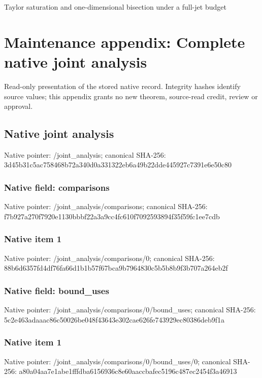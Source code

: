 \documentclass[10pt,a4paper]{article}
\begin{document}
\begingroup\raggedright\sloppy Taylor saturation and one-dimensional bisection under a full-jet budget\par\endgroup

\section{Maintenance appendix: Complete native joint analysis}
Read-only presentation of the stored native record. Integrity hashes identify source values; this appendix grants no new theorem, source-read credit, review or approval.

\subsection{Native joint analysis}
Native pointer: /joint\_\allowbreak{}analysis; canonical SHA-256: 3d45b31c5ac758468b72a340d0a331322eb6a49b22dde445927c7391e6e50c80

\subsubsection{Native field: comparisons}
Native pointer: /joint\_\allowbreak{}analysis/comparisons; canonical SHA-256: f7b927a270f7920e1130bbbf22a3a9cc4fc610f7092593894f35f59fc1ee7cdb

\subsubsection{Native item 1}
Native pointer: /joint\_\allowbreak{}analysis/comparisons/0; canonical SHA-256: 88b6d6357fd4df76fa66d1b1b57f67bca9b7964830c5b5b8b9f3b707a264eb2f

\subsubsection{Native field: bound\_\allowbreak{}uses}
Native pointer: /joint\_\allowbreak{}analysis/comparisons/0/bound\_\allowbreak{}uses; canonical SHA-256: 5c2e463adaaac86c50026be048f43643e302cae626fe743929ec80386deb9f1a

\subsubsection{Native item 1}
Native pointer: /joint\_\allowbreak{}analysis/comparisons/0/bound\_\allowbreak{}uses/0; canonical SHA-256: a80a04aa7e1abe1fffdba6156936c8e60aaccbafec5196c487ec2454f3a46913
\end{document}
